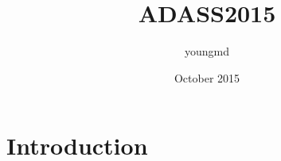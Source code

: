 \documentclass{article}
\title{ADASS2015}
\author{youngmd }
\date{October 2015}
\begin{document}
\maketitle

\section{Introduction}
\end{document}
